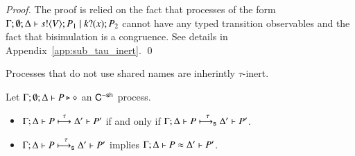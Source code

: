 \begin{proof}
	The proof is relied on the fact that processes of the
	form $\Gamma; \emptyset; \Delta \vdash s ! \langle V \rangle ; P_1 \;|\; k ? (x) ; P_2$
	cannot have any typed transition observables and the fact
	that bisimulation is a congruence.
	See details in Appendix~\ref{app:sub_tau_inert}.
	\qed
\end{proof}

Processes that do not use shared names are inherintly $\tau$-inert.

\begin{corollary}\rm
	\label{cor:tau_inert}
	Let $\Gamma; \emptyset; \Delta \vdash P \triangleright \diamond$ an $\mathsf{C}^{\mathsf{-sh}}$ process.
%
	\begin{itemize}
		\item	$\Gamma; \Delta \vdash P \stackrel{\tau}{\longmapsto} \Delta' \vdash P'$ if and only if $\Gamma; \Delta \vdash P \stackrel{\tau}{\longmapsto_{\mathsf{s}}} \Delta' \vdash P'$.
		\item	$\Gamma; \Delta \vdash P \stackrel{\tau}{\longmapsto_{\mathsf{s}}} \Delta' \vdash P'$ implies $\Gamma; \Delta \vdash P \approx \Delta' \vdash P'$.
	\end{itemize}
\end{corollary}

